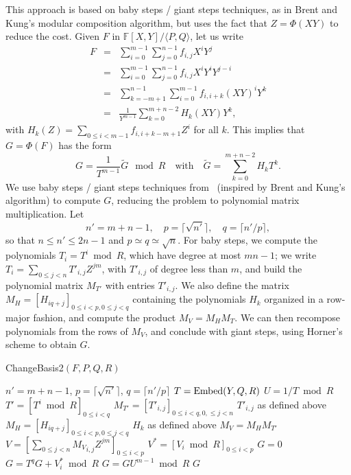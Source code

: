 \documentclass{sig-alternate}
\def\F {\ensuremath{\mathbb{F}}}
\begin{document}
This approach is based on baby steps / giant steps techniques, as in
Brent and Kung's modular composition algorithm, but uses the fact that
$Z=\Phi(XY)$ to reduce the cost. Given $F$ in $\F[X,Y]/\langle
P,Q\rangle$, let us write
\begin{eqnarray*}
F&=&\sum_{i=0}^{m-1}\sum_{j=0}^{n-1} f_{i,j}X^i Y^j\\
&=&\sum_{i=0}^{m-1}\sum_{j=0}^{n-1} f_{i,j}X^i Y^i Y^{j-i}\\
&=&\sum_{k=-m+1}^{n-1}\sum_{i=0}^{m-1} f_{i,i+k}(XY)^i Y^k\\
&=&\frac{1}{Y^{m-1}} \sum_{k=0}^{m+n-2} H_k(XY) Y^k,
\end{eqnarray*}
with $H_k(Z)=\sum_{0 \le i < m-1} f_{i,i+k-m+1} Z^i$ for all $k$.
This implies that $G=\Phi(F)$ has the form
$$G = \frac{1}{T^{m-1}}\widetilde{G} \mod R\quad\text{with}\quad
\widetilde{G}=\sum_{k=0}^{m+n-2} H_k T^k.$$ We use baby steps / giant
steps techniques from~\cite{LeMeSc13} (inspired by Brent and Kung's
algorithm) to compute $G$, reducing the problem to polynomial matrix
multiplication. Let
$$n'=m+n-1,\quad p=\lceil \sqrt {n'} \rceil,\quad q=\lceil
n'/p\rceil,$$ so that $n \le n' \le 2n-1$ and $p\simeq q \simeq
\sqrt{n}$.  For baby steps, we compute the polynomials $T_i=T^i \bmod
R$, which have degree at most $mn-1$; we write $T_i = \sum_{0 \le j <
  n} T'_{i,j} Z^{jm}$, with $T'_{i,j}$ of degree less than $m$, and
build the polynomial matrix $M_{T'}$ with entries $T'_{i,j}$.  We also
define the matrix $M_H=[H_{iq+j}]_{0 \le i <p, 0 \le j < q}$
containing the polynomials $H_k$ organized in a row-major fashion, and
compute the product $M_V=M_H M_T$. We can then recompose polynomials
from the rows of $M_V$, and conclude with giant steps, using Horner's
scheme to obtain $G$.
\begin{algorithm}[H]
  \caption{ChangeBasis2$(F,P,Q,R)$}
  \begin{algorithmic}[1]
    \STATE $n'=m+n-1$, $p=\lceil \sqrt {n'} \rceil$, $q=\lceil n'/p\rceil$
    \STATE\label{iso2:2} $T={\rm Embed}(Y,Q,R)$
    \STATE\label{iso2:3} $U=1/T \bmod R$
    \STATE\label{iso2:4} $T'=[T^i \bmod R]_{0 \le i < q}$
    \STATE $M_{T'}=[T'_{i,j}]_{0\le i < q, 0, \le j < n}$ \hfill $T'_{i,j}$ as defined above
    \STATE $M_H=[H_{iq+j}]_{0 \le i <p, 0 \le j < q}$ \hfill $H_k$ as defined above
    \STATE\label{iso2:7} $M_V = M_H M_{T'}$
    \STATE $V=[\sum_{0 \le j <n} {M_V}_{i,j} Z^{jm} ]_{0 \le i <p}$
    \STATE $V^*=[V_i \bmod R]_{0 \le i <p}$
    \STATE $G=0$
    \label{iso2:11}
    \STATE $G=T^qG+V^*_i \bmod R$
    \ENDFOR
    \STATE\label{iso2:14} $G=G U^{m-1} \bmod R$
    \RETURN $G$
  \end{algorithmic}
  \label{algo:iso2}
\end{algorithm}
\end{document}
